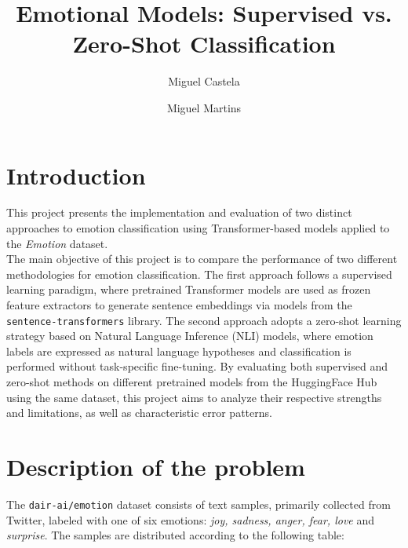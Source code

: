 \documentclass[runningheads]{llncs}
\begin{document}
%
\title{Emotional Models: Supervised vs. Zero-Shot Classification}
%
%
\author{Miguel Castela \and
Miguel Martins} 
%
%
%
\maketitle              %
%
\section{Introduction}

This project presents the implementation and evaluation of two distinct approaches to emotion classification using Transformer-based models applied to the \textit{Emotion} dataset.
\noindent
\\
The main objective of this project is to compare the performance of two different methodologies for emotion classification. The first approach follows a supervised learning paradigm, where pretrained Transformer models are used as frozen feature extractors to generate sentence embeddings via models from the \texttt{sentence-transformers} library. The second approach adopts a zero-shot learning strategy based on Natural Language Inference (NLI) models, where emotion labels are expressed as natural language hypotheses and classification is performed without task-specific fine-tuning. By evaluating both supervised and zero-shot methods on different pretrained models from the HuggingFace Hub using the same dataset, this project aims to analyze their respective strengths and limitations, as well as characteristic error patterns.

\section{Description of the problem}

The \texttt{dair-ai/emotion} dataset consists of text samples, primarily collected from Twitter, labeled with one of six emotions: \textit{joy, sadness, anger, fear, love} and \textit{surprise}. The samples are distributed according to the following table:
\end{document}
